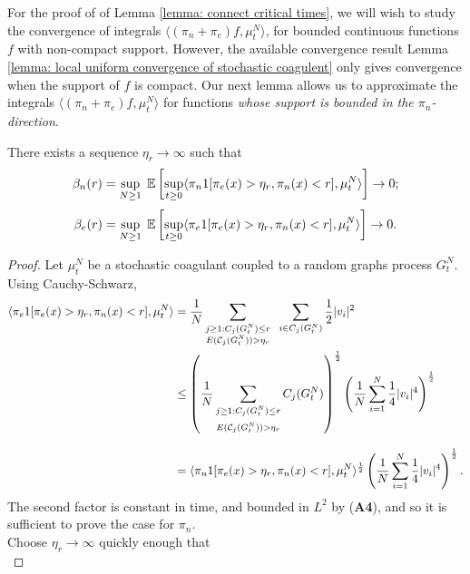 For the proof of of Lemma \ref{lemma: connect critical times}, we will wish to study the convergence of integrals $\langle (\pi_n+\pi_e)f, \mu^N_t\rangle$, for bounded continuous functions $f$ with non-compact support. However, the available convergence result Lemma \ref{lemma: local uniform convergence of stochastic coagulent} only gives convergence when the support of $f$ is compact. Our next lemma allows us to approximate the integrals $\langle (\pi_n+\pi_e)f, \mu^N_t\rangle$ for functions \emph{whose support is bounded in the $\pi_n$-direction}. \begin{lemma}\label{lemma: etar} There exists a sequence $\eta_r \rightarrow \infty$ such that \begin{equation}
    \beta_n(r)=\sup_{N\geq 1} \hspace{0.1cm} \mathbb{E}\left[\sup_{t\geq 0}\langle \pi_n 1[\pi_e(x)>\eta_r, \pi_n(x)< r], \mu^N_t\rangle \right]\rightarrow 0;
\end{equation} \begin{equation}
    \beta_e(r)= \sup_{N\geq 1} \hspace{0.1cm} \mathbb{E}\left[\sup_{t\geq 0}\langle \pi_e 1[\pi_e(x)>\eta_r, \pi_n(x)< r], \mu^N_t\rangle\right] \rightarrow 0. 
\end{equation} \end{lemma} \begin{proof} Let $\mu^N_t$ be a stochastic coagulant coupled to a random graphs process $G^N_t$. Using Cauchy-Schwarz, \begin{equation} \begin{split}
   \langle \pi_e 1[\pi_e(x)>\eta_r, \pi_n(x)< r], \mu^N_t\rangle & = \frac{1}{N} \sum_{\substack{j\geq 1: C_j(G^N_t)\le r \\ E(\mathcal{C}_j(G^N_t))>\eta_r}} \hspace{0.2cm} \sum_{i\in C_j(G^N_t)} \frac{1}{2}|v_i|^2  \\ & \leq \left(\frac{1}{N} \sum_{\substack{j\geq 1: C_j(G^N_t)\le r \\[1ex] E(\mathcal{C}_j(G^N_t))>\eta_r}} C_j(G^N_t)\right)^\frac{1}{2}\left(\frac{1}{N}\sum_{i=1}^N \frac{1}{4}|v_i|^4\right)^\frac{1}{2}  \\[2ex] & = \langle \pi_n 1[\pi_e(x)>\eta_r, \pi_n(x)< r], \mu^N_t\rangle^\frac{1}{2}\left(\frac{1}{N}\sum_{i=1}^N \frac{1}{4}|v_i|^4\right)^\frac{1}{2}.
\end{split} \end{equation} The second factor is constant in time, and bounded in $L^2$ by (\textbf{A4}), and so it is sufficient to prove the case for $\pi_n$. \medskip \\ Choose $\eta_r\rightarrow \infty$ quickly enough that \begin{equation} \label{eq: choice of etar}

\end{equation}
\end{proof}
